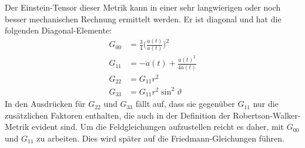 Der Einstein-Tensor dieser Metrik kann in einer sehr langwierigen oder
noch besser mechanischen Rechnung ermittelt werden.
Er ist diagonal und hat die folgenden Diagonal-Elemente:
\begin{align*}
G_{00}
&=
\frac{3}{4}\biggl(\frac{\dot a(t)}{a(t)}\biggr)^2
\\
G_{11}
&=
-\ddot a(t) +\frac{\dot a(t)^2}{4a(t)}
\\
G_{22}
&=
G_{11} r^2
\\
G_{33}
&=
G_{11} r^2\sin^2\vartheta
\end{align*}
In den Ausdrücken für $G_{22}$ und $G_{33}$ fällt auf, dass sie gegenüber
$G_{11}$ nur die zusätzlichen Faktoren enthalten, die auch in der Definition
der Robertson-Walker-Metrik evident sind.
Um die Feldgleichungen aufzustellen reicht es daher, mit $G_{00}$ und
$G_{11}$ zu arbeiten.
Dies wird später auf die Friedmann-Gleichungen führen.



